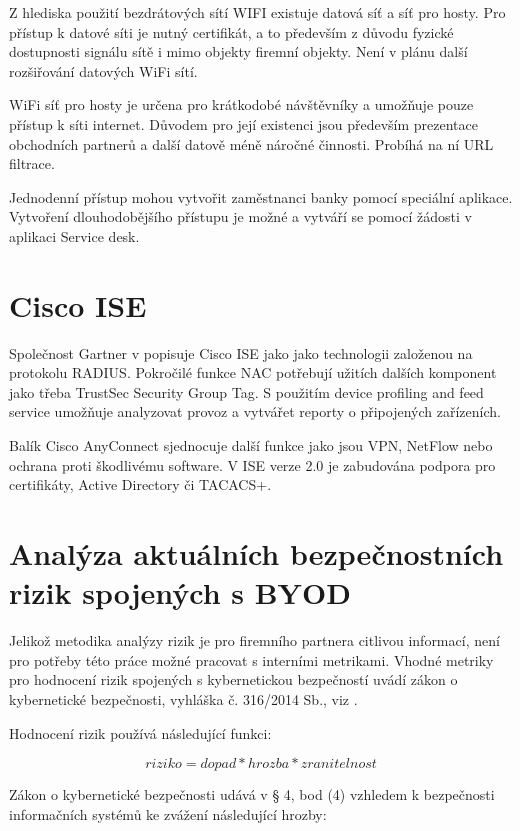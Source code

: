 Z hlediska použití bezdrátových sítí WIFI existuje datová síť a síť pro hosty. Pro přístup k datové síti je nutný certifikát, a to především z důvodu fyzické dostupnosti signálu sítě i mimo objekty firemní objekty. Není v plánu další rozšiřování datových WiFi sítí.  

WiFi síť pro hosty je určena pro krátkodobé návštěvníky a umožňuje pouze přístup k síti internet. Důvodem pro její existenci jsou především prezentace obchodních partnerů a další datově méně náročné činnosti. Probíhá na ní URL filtrace.

Jednodenní přístup mohou vytvořit zaměstnanci banky pomocí speciální aplikace. Vytvoření dlouhodobějšího přístupu je možné a vytváří se pomocí žádosti v aplikaci Service desk. 

\section{Cisco ISE}
Společnost Gartner v \cite{GartnerNAC} popisuje Cisco ISE jako jako technologii založenou na protokolu RADIUS. Pokročilé funkce NAC potřebují užitích dalších komponent jako třeba TrustSec Security Group Tag. S použitím device profiling and feed service umožňuje analyzovat provoz a vytvářet reporty o připojených zařízeních.

Balík Cisco AnyConnect sjednocuje další funkce jako jsou VPN, NetFlow nebo ochrana proti škodlivému software. V ISE verze 2.0 je zabudována podpora pro certifikáty, Active Directory či TACACS+.

\section{Analýza aktuálních bezpečnostních rizik spojených s BYOD}
Jelikož metodika analýzy rizik je pro firemního partnera citlivou informací, není pro potřeby této práce možné pracovat s interními metrikami. Vhodné metriky pro hodnocení rizik spojených s kybernetickou bezpečností uvádí zákon o kybernetické bezpečnosti, vyhláška č. 316/2014 Sb., viz \cite{Zakon1}.

Hodnocení rizik používá následující funkci:

$$ riziko = dopad * hrozba * zranitelnost $$


Zákon o kybernetické bezpečnosti udává v § 4, bod (4) vzhledem k bezpečnosti informačních systémů ke zvážení následující hrozby:

